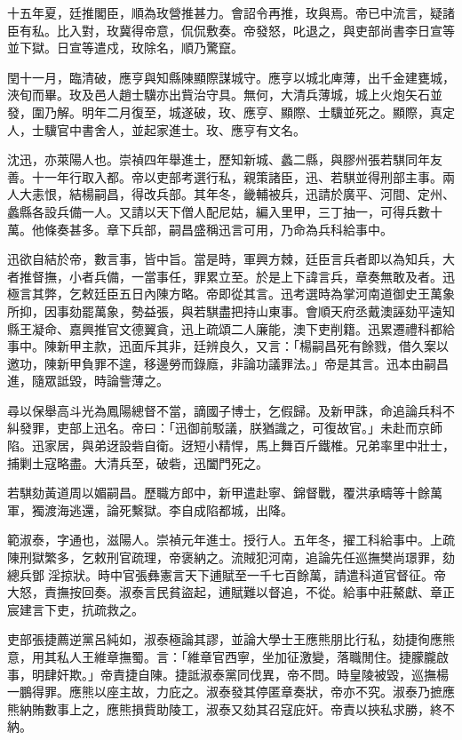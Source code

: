 \begin{pinyinscope}
十五年夏，廷推閣臣，順為玫營推甚力。會詔令再推，玫與焉。帝已中流言，疑諸臣有私。比入對，玫冀得帝意，侃侃敷奏。帝發怒，叱退之，與吏部尚書李日宣等並下獄。日宣等遣戍，玫除名，順乃驚竄。

閏十一月，臨清破，應亨與知縣陳顯際謀城守。應亨以城北庳薄，出千金建甕城，浹旬而畢。玫及邑人趙士驥亦出貲治守具。無何，大清兵薄城，城上火炮矢石並發，圍乃解。明年二月復至，城遂破，玫、應亨、顯際、士驥並死之。顯際，真定人，士驥官中書舍人，並起家進士。玫、應亨有文名。

沈迅，亦萊陽人也。崇禎四年舉進士，歷知新城、蠡二縣，與膠州張若騏同年友善。十一年行取入都。帝以吏部考選行私，親策諸臣，迅、若騏並得刑部主事。兩人大恚恨，結楊嗣昌，得改兵部。其年冬，畿輔被兵，迅請於廣平、河間、定州、蠡縣各設兵備一人。又請以天下僧人配尼姑，編入里甲，三丁抽一，可得兵數十萬。他條奏甚多。章下兵部，嗣昌盛稱迅言可用，乃命為兵科給事中。

迅欲自結於帝，數言事，皆中旨。當是時，軍興方棘，廷臣言兵者即以為知兵，大者推督撫，小者兵備，一當事任，罪累立至。於是上下諱言兵，章奏無敢及者。迅極言其弊，乞敕廷臣五日內陳方略。帝即從其言。迅考選時為掌河南道御史王萬象所抑，因事劾罷萬象，勢益張，與若騏盡把持山東事。會順天府丞戴澳誣劾平遠知縣王凝命、嘉興推官文德翼貪，迅上疏頌二人廉能，澳下吏削籍。迅累遷禮科都給事中。陳新甲主款，迅面斥其非，廷辨良久，又言：「楊嗣昌死有餘戮，借久案以邀功，陳新甲負罪不遑，移邊勞而錄廕，非論功議罪法。」帝是其言。迅本由嗣昌進，隨眾詆毀，時論訾薄之。

尋以保舉高斗光為鳳陽總督不當，謫國子博士，乞假歸。及新甲誅，命追論兵科不糾發罪，吏部上迅名。帝曰：「迅御前駁議，朕猶識之，可復故官。」未赴而京師陷。迅家居，與弟迓設砦自衛。迓短小精悍，馬上舞百斤鐵椎。兄弟率里中壯士，捕剿土寇略盡。大清兵至，破砦，迅闔門死之。

若騏劾黃道周以媚嗣昌。歷職方郎中，新甲遣赴寧、錦督戰，覆洪承疇等十餘萬軍，獨渡海逃還，論死繫獄。李自成陷都城，出降。

範淑泰，字通也，滋陽人。崇禎元年進士。授行人。五年冬，擢工科給事中。上疏陳刑獄繁多，乞敕刑官疏理，帝褒納之。流賊犯河南，追論先任巡撫樊尚璟罪，劾總兵鄧淫掠狀。時中官張彝憲言天下逋賦至一千七百餘萬，請遣科道官督征。帝大怒，責撫按回奏。淑泰言民貧盜起，逋賦難以督追，不從。給事中莊鰲獻、章正宸建言下吏，抗疏救之。

吏部張捷薦逆黨呂純如，淑泰極論其謬，並論大學士王應熊朋比行私，劾捷徇應熊意，用其私人王維章撫蜀。言：「維章官西寧，坐加征激變，落職閒住。捷朦朧啟事，明肆奸欺。」帝責捷自陳。捷詆淑泰黨同伐異，帝不問。時皇陵被毀，巡撫楊一鵬得罪。應熊以座主故，力庇之。淑泰發其停匿章奏狀，帝亦不究。淑泰乃摭應熊納賄數事上之，應熊損貲助陵工，淑泰又劾其召寇庇奸。帝責以挾私求勝，終不納。


\end{pinyinscope}

